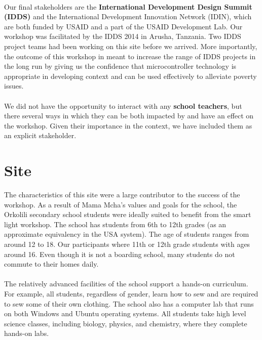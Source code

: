 \documentclass[11pt, twocolumn]{article}
\begin{document}
\ \\
Our final stakeholders are the \textbf{International Development Design Summit (IDDS)} and the International Development Innovation Network (IDIN), which are both funded by USAID and a part of the USAID Development Lab. Our workshop was facilitated by the IDDS 2014 in Arusha, Tanzania. Two IDDS project teams had been working on this site before we arrived. More importantly, the outcome of this workshop in meant to increase the range of IDDS projects in the long run by giving us the confidence that microcontroller technology is appropriate in developing context and can be used effectively to alleviate poverty issues.\ \\
\ \\
We did not have the opportunity to interact with any \textbf{school teachers}, but there several ways in which they can be both impacted by and have an effect on the workshop. Given their importance in the context, we have included them as an explicit stakeholder.

\section*{Site}
The characteristics of this site were a large contributor to the success of the workshop. As a result of Mama Mcha’s values and goals for the school, the Orkolili secondary school students were ideally suited to benefit from the smart light workshop. The school has students from 6th to 12th grades (as an approximate equivalency in the USA system). The age of students ranges from around 12 to 18. Our participants where 11th or 12th grade students with ages around 16. Even though it is not a boarding school, many students do not commute to their homes daily.\ \\
\ \\
The relatively advanced facilities of the school support a hands-on curriculum. For example, all students, regardless of gender, learn how to sew and are required to sew some of their own clothing. The school also has a computer lab that runs on both Windows and Ubuntu operating systems. All students take high level science classes, including biology, physics, and chemistry, where they complete hands-on labs.
\end{document}
